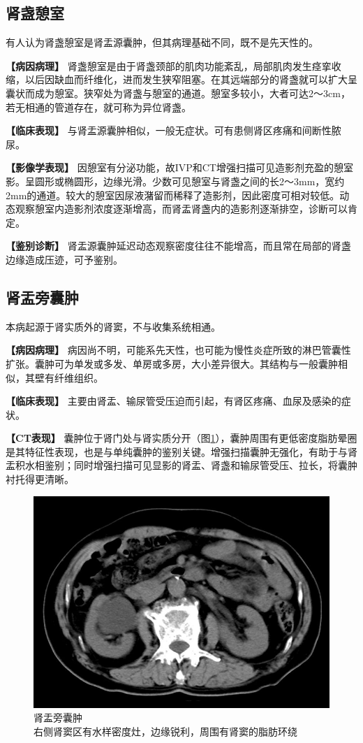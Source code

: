 \subsection{肾盏憩室}

有人认为肾盏憩室是肾盂源囊肿，但其病理基础不同，既不是先天性的。

\textbf{【病因病理】}
肾盏憩室是由于肾盏颈部的肌肉功能紊乱，局部肌肉发生痉挛收缩，以后因缺血而纤维化，进而发生狭窄阻塞。在其远端部分的肾盏就可以扩大呈囊状而成为憩室。狭窄处为肾盏与憩室的通道。憩室多较小，大者可达2～3cm，若无相通的管道存在，就可称为异位肾盏。

\textbf{【临床表现】}
与肾盂源囊肿相似，一般无症状。可有患侧肾区疼痛和间断性脓尿。

\textbf{【影像学表现】}
因憩室有分泌功能，故IVP和CT增强扫描可见造影剂充盈的憩室影。呈圆形或椭圆形，边缘光滑。少数可见憩室与肾盏之间的长2～3mm，宽约2mm的通道。较大的憩室因尿液潴留而稀释了造影剂，因此密度可相对较低。动态观察憩室内造影剂浓度逐渐增高，而肾盂肾盏内的造影剂逐渐排空，诊断可以肯定。

\textbf{【鉴别诊断】}
肾盂源囊肿延迟动态观察密度往往不能增高，而且常在局部的肾盏边缘造成压迹，可予鉴别。

\subsection{肾盂旁囊肿}

本病起源于肾实质外的肾窦，不与收集系统相通。

\textbf{【病因病理】}
病因尚不明，可能系先天性，也可能为慢性炎症所致的淋巴管囊性扩张。囊肿可为单发或多发、单房或多房，大小差异很大。其结构与一般囊肿相似，其壁有纤维组织。

\textbf{【临床表现】}
主要由肾盂、输尿管受压迫而引起，有肾区疼痛、血尿及感染的症状。

\textbf{【CT表现】}
囊肿位于肾门处与肾实质分开（图\ref{fig15-16}），囊肿周围有更低密度脂肪晕圈是其特征性表现，也是与单纯囊肿的鉴别关键。增强扫描囊肿无强化，有助于与肾盂积水相鉴别；同时增强扫描可见显影的肾盂、肾盏和输尿管受压、拉长，将囊肿衬托得更清晰。

\begin{figure}[!htbp]
 \centering
 \includegraphics[width=.7\textwidth,height=\textheight,keepaspectratio]{./images/Image00332.jpg}
 \captionsetup{justification=centering}
 \caption{肾盂旁囊肿\\{\small 右侧肾窦区有水样密度灶，边缘锐利，周围有肾窦的脂肪环绕}}
 \label{fig15-16}
  \end{figure} 

